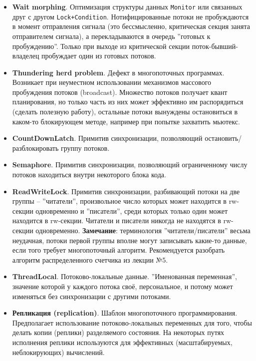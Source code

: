 \documentclass[a4paper, 12pt]{extarticle}
\begin{document}
\begin{itemize}
	\item \textbf{Wait morphing}. Оптимизация структуры данных \texttt{Monitor} или связанных друг с другом \texttt{Lock+Condition}.
	Нотифицированные потоки не пробуждаются в момент отправления сигнала (это бессмысленно, критическая секция занята отправителем сигнала), а перекладываются в очередь ''готовых к пробуждению''. Только при выходе из критической секции поток-бывший-владелец пробуждает один из готовых потоков.

	\item \textbf{Thundering herd problem}. Дефект в многопоточных программах. Возникает при неуместном использовании механизмов массового пробуждения потоков (broadcast). Множество потоков получает квант планирования, но только часть из них может эффективно им распорядиться (сделать полезную работу), остальные потоки вынуждены остановиться в каком-то блокирующем методе, например при попытке захватить мьютекс.

	\item \textbf{CountDownLatch}. Примитив синхронизации, позволяющий остановить/разблокировать группу потоков.

	\item \textbf{Semaphore}. Примитив синхронизации, позволяющий ограниченному числу потоков находиться внутри некоторого блока кода. 
	
	\item \textbf{ReadWriteLock}. Примитив синхронизации, разбивающий потоки на две группы -- ''читатели'', произвольное число которых может находится в rw-секции одновременно и ''писатели'', среди которых только один может находится в rw-секции. Читатели и писатели никогда не находятся в rw-секции одновременно. \textbf{Замечание}: терминология ''читатели/писатели'' весьма неудачная, потоки первой группы вполне могут записывать какие-то данные, если того требует многопоточный алгоритм. Рекомендуется разобрать алгоритм распределенного счетчика из лекции №5.   
	
	\item \textbf{ThreadLocal}. Потоково-локальные данные. ''Именованная переменная'', значение которой у каждого потока своё, персональное, и потому может изменяться без синхронизации с другими потоками.
	
	\item \textbf{Репликация (replication)}. Шаблон многопоточного программирования. Предполагает использование потоково-локальных переменных для того, чтобы делать копии (реплики) разделяемого состояния. На некоторых путях исполнения реплики используются для эффективных (масштабируемых, неблокирующих) вычислений.
	

\end{itemize}
\end{document}
